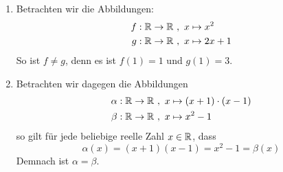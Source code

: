 \begin{bsp} \label{bsp:abbgleich} \quad
    \begin{enumerate}
        \item Betrachten wir die Abbildungen: 
        \begin{align*}
            f: \mathbb R \to \mathbb R\ &,\ x \mapsto x^2 \\
            g: \mathbb R \to \mathbb R\ &,\ x \mapsto 2x+1
        \end{align*}
        So ist $f \neq g$, denn es ist $f(1)=1$ und $g(1)=3$.
        \item Betrachten wir dagegen die Abbildungen
        \begin{align*}
            \alpha: \mathbb R \to \mathbb R\ &,\ x \mapsto (x+1)\cdot (x-1) \\
            \beta: \mathbb R \to \mathbb R\ &,\ x \mapsto  x^2-1
        \end{align*}
        so gilt für jede beliebige reelle Zahl $x\in \mathbb R$, dass
            \[ \alpha(x) = (x+1)(x-1) = x^2-1 = \beta(x) \]
        Demnach ist $\alpha=\beta$.
    \end{enumerate}
\end{bsp}


